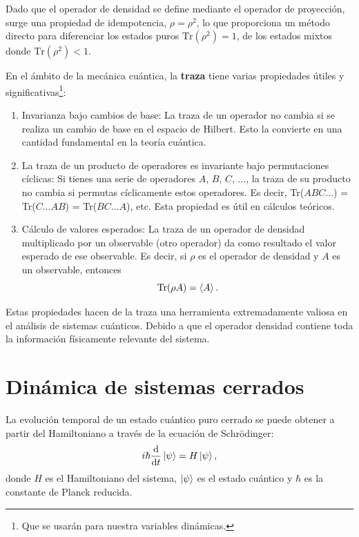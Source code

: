 \documentclass[../main.tex]{subfiles}
\begin{document}
Dado que el operador de densidad se define mediante el operador de proyección, surge una propiedad de idempotencia, $\rho= \rho^2$, lo que proporciona un método directo para diferenciar los estados puros $\text{Tr}(\rho^2) =1$, de los estados mixtos donde $\text{Tr}(\rho^2) < 1$.

En el ámbito de la mecánica cuántica, la \textbf{traza} tiene varias propiedades útiles y significativas\footnote{Que se usarán para nuestra variables dinámicas.}:
\begin{enumerate}[1.]
	\item Invarianza bajo cambios de base: La traza de un operador no cambia si se realiza un cambio de base en el espacio de Hilbert. Esto la convierte en una cantidad fundamental en la teoría cuántica.
	\item La traza de un producto de operadores es invariante bajo permutaciones cíclicas: Si tienes una serie de operadores $A$, $B$, $C$, ..., la traza de su producto no cambia si permutas cíclicamente estos operadores. Es decir, Tr($ABC...$) = Tr($C...AB$) = Tr($BC...A$), etc. Esta propiedad es útil en cálculos teóricos.
	\item Cálculo de valores esperados: La traza de un operador de densidad multiplicado por un observable (otro operador) da como resultado el valor esperado de ese observable. Es decir, si $\rho$ es el operador de densidad y $A$ es un observable, entonces 
	\begin{equation}
		\text{Tr}(\rho A) = \braket{A}.
	\end{equation}
\end{enumerate}

Estas propiedades hacen de la traza una herramienta extremadamente valiosa en el análisis de sistemas cuánticos. Debido a que el operador densidad contiene toda la información físicamente relevante del sistema.

\section{Dinámica de sistemas cerrados}

La evolución temporal de un estado cuántico puro cerrado se puede obtener a partir del Hamiltoniano a través de la ecuación de Schrödinger:
\begin{equation} \label{eq:schrodinger}
	i \hbar \frac{\mathrm{d}}{\mathrm{d}t} \ket{\psi} = H \ket{\psi},
\end{equation}
donde $H$ es el Hamiltoniano del sistema, $\ket{\psi}$ es el estado cuántico y $\hbar$ es la constante de Planck reducida.
\end{document}
